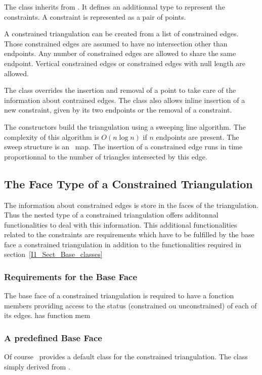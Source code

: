 The class 
inherits from .
It defines an additionnal type 
to represent the constraints. A
constraint is represented as a pair of points.

A  constrained triangulation can be created
from a
list of constrained edges. Those constrained edges are assumed to have no
intersection other than endpoints. Any number of constrained edges are
allowed to share the same endpoint.  Vertical constrained edges or
constrained edges with null length are allowed.

The class 
overrides the insertion and removal of a point to take care of the
information about contrained edges. The class also allows inline
insertion of a new constraint, given by its two endpoints
or the removal of a constraint.



The constructors build the triangulation using a sweeping line
algorithm. The complexity of this algorithm is $O(n\log n)$ if $n$
endpoints are present. The sweep structure is an \stl\ map.
 The insertion of a constrained edge runs in time
proportionnal to the number of triangles intersected by this edge.



\subsection{The Face Type of a Constrained Triangulation}
\label{I1_Sect_Constrained_face}
 The information about constrained edges is store in the 
faces of the triangulation. Thus the nested 
type of a constrained triangulation offers
additonnal functionalities to deal with this information.
This additional functionalities related to the constraints
are requirements which have to be fulfilled
by the base face  a constrained triangulation
in addition to the functionalities required in section~\ref{I1_Sect_Base_classes}

\subsubsection{Requirements for the Base Face}
The base face of a constrained triangulation is required
to have a fonction members providing access to the status
(constrained ou unconstrained) of each of its edges.
has function mem

\subsubsection{A predefined Base Face}
Of course  \cgal\ provides a default  class
for the constrained triangulation. The class
simply derived from 
. 


